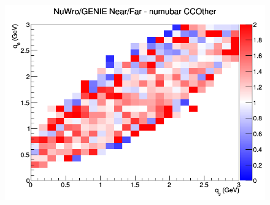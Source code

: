 \begin{figure}[h]
\endminipage
{}
\includegraphics[width=\linewidth]{eff_q0_q3/FGT/ratios/CCOther_NuWro_GENIE_numubar_NF_q3_q0.png}
\endminipage
\newline
\end{figure}
\clearpage
